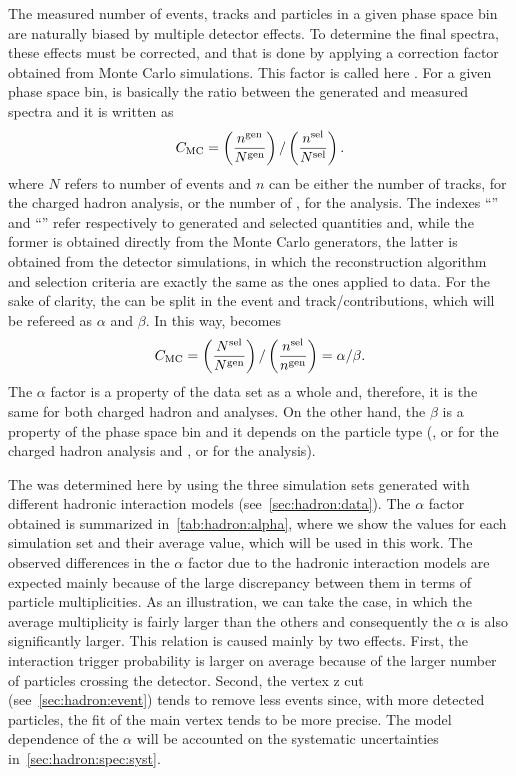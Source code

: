The measured number of events, tracks and \vzero
particles in a given phase space bin are naturally biased by
multiple detector effects. To determine the final spectra,
these effects must be corrected, and that
is done by applying a correction factor obtained
from Monte Carlo simulations. This factor is called here \cmc.
For a given phase space bin, \cmc is basically the ratio
between the generated and measured spectra and it
is written as
\begin{equation}
  \mbox{$C_\text{MC}$} = \left( \frac{n^\text{gen}}{N^\text{gen}} \right) / \left( \frac{n^\text{sel}}{N^\text{sel}} \right).
  \label{eq:hadron:correction:cmc}
\end{equation}
where $N$ refers to number of events and $n$ can be either the number of
tracks, for the charged hadron analysis, or the number
of \vzeros, for the \vzero analysis.
The indexes ``\gen'' and ``\sel'' refer respectively to generated and selected quantities and,
while the former is obtained directly from the Monte Carlo generators,
the latter is obtained from the detector simulations, in which the
reconstruction algorithm and selection criteria are exactly the same
as the ones applied to data.
For the sake of clarity, the \cmc can be split in the
event and track/\vzero contributions, which will be refereed as
$\alpha$ and $\beta$. In this way, \cmc becomes
\begin{equation}
  \mbox{$C_\text{MC}$} = \left( \frac{N^\text{sel}}{N^\text{gen}} \right) / \left( \frac{n^\text{sel}}{n^\text{gen}} \right) = \alpha / \beta.
  \label{eq:hadron:correction:cmc:2}
\end{equation}
The $\alpha$ factor is a property of the data set
as a whole and, therefore, it is the same for
both charged hadron and \vzero analyses.
On the other hand, the $\beta$ is a property of the
phase space bin and it depends on the particle type
(\pions, \kaons or \protonpm for the charged hadron analysis
and \lamb, \antilamb or \kzeros for the \vzero analysis).

The \cmc was determined here by using
the three simulation sets generated with different hadronic
interaction models (see~\cref{sec:hadron:data}).
The $\alpha$ factor obtained is summarized
in~\cref{tab:hadron:alpha}, where we show the values for each simulation
set and their average value, which will be used in this work. 
The observed differences in the $\alpha$ factor due
to the hadronic interaction models are expected mainly
because of the large discrepancy between them in terms of particle
multiplicities. As an illustration, we can take the \DPMJetLong
case, in which the average multiplicity is
fairly larger than the others and consequently the
$\alpha$ is also significantly larger. 
This relation is caused mainly by two effects. First,
the interaction trigger probability is larger on average
because of the larger number of particles crossing the detector.
Second, the vertex z cut (see~\cref{sec:hadron:event})
tends to remove less events since, with more detected particles,
the fit of the main vertex tends to be more precise.
The model dependence of the $\alpha$ will be accounted
on the systematic uncertainties in~\cref{sec:hadron:spec:syst}.

